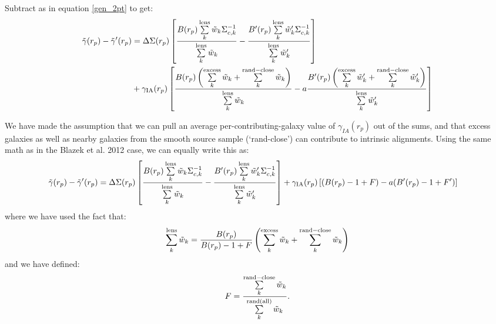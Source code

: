 \documentclass[onecolumn,amsmath,aps,fleqn, superscriptaddress]{revtex4}
\begin{document}
Subtract as in equation \ref{gen_2pt} to get:
\begin{align}
\tilde{\gamma}(r_p) - \tilde{\gamma}^\prime(r_p) &= \Delta \Sigma(r_p)\left[\frac{B(r_p) \sum\limits_{k}^{\rm lens} \tilde{w}_k \Sigma_{c,k}^{-1}}{\sum\limits_{k}^{\rm lens} \tilde{w}_k} - \frac{B^\prime(r_p) \sum\limits_{k}^{\rm lens} \tilde{w}^\prime_k \Sigma_{c,k}^{-1}}{\sum\limits_{k}^{\rm lens} \tilde{w}^\prime_k}\right] \nonumber \\ &+\gamma_{\rm IA}(r_p) \left[\frac{B(r_p) \left(\sum\limits_{k}^{\rm excess} \tilde{w}_k + \sum\limits_{k}^{\rm rand-close} \tilde{w}_k\right)}{\sum\limits_{k}^{\rm lens} \tilde{w}_k}-a\frac{B^\prime(r_p) \left(\sum\limits_{k}^{\rm excess} \tilde{w}^\prime_k  + \sum\limits_{k}^{\rm rand-close} \tilde{w}^\prime_k\right)}{\sum\limits_{k}^{\rm lens} \tilde{w}^\prime_k} \right]
\label{subtract_gammat}
\end{align}

We have made the assumption that we can pull an average per-contributing-galaxy value of $\gamma_{IA}(r_p)$ out of the sums, and that excess galaxies as well as nearby galaxies from the smooth source sample (`rand-close') can contribute to intrinsic alignments. Using the same math as in the Blazek et al. 2012 case, we can equally write this as:  
\begin{align}
\tilde{\gamma}(r_p) - \tilde{\gamma}^\prime(r_p) &= \Delta \Sigma(r_p)\left[\frac{B(r_p) \sum\limits_{k}^{\rm lens} \tilde{w}_k \Sigma_{c,k}^{-1}}{\sum\limits_{k}^{\rm lens} \tilde{w}_k} - \frac{B^\prime(r_p) \sum\limits_{k}^{\rm lens} \tilde{w}^\prime_k \Sigma_{c,k}^{-1}}{\sum\limits_{k}^{\rm lens} \tilde{w}^\prime_k}\right] +\gamma_{\rm IA}(r_p) \left[(B(r_p)-1+F)-a(B^\prime(r_p)-1+F^\prime) \right]
\label{subtract_gammat_2}
\end{align}
where we have used the fact that:
\begin{equation}
\sum\limits_{k}^{\rm lens} \tilde{w}_k = \frac{B(r_p)}{B(r_p)-1+F} \left(\sum\limits_{k}^{\rm excess} \tilde{w}_k + \sum\limits_{k}^{\rm rand-close} \tilde{w}_k\right)
\label{lens_weights_expand}
\end{equation}
and we have defined:
\begin{equation}
F = \frac{\sum\limits^{\rm rand-close}_{k} \tilde{w}_k}{\sum\limits^{\rm rand(all)}_{k} \tilde{w}_k}.
\label{Frp}
\end{equation}
\end{document}
